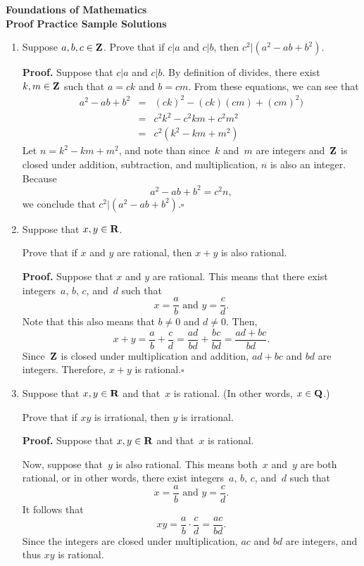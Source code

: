 \documentclass[12pt,letterpaper]{report}
\def\Z{{\bf Z}}
\def\Q{{\bf Q}}
\def\R{{\bf R}}
\begin{document}
\begin{center}
{\bf Foundations of Mathematics \\
Proof Practice Sample Solutions}\\
\end{center}


\begin{enumerate}

\item  Suppose $a,b,c\in\Z$.  Prove that if $c|a$ and $c|b$, then $c^2|(a^2 - ab + b^2)$.

\smallskip
\noindent\textbf{Proof.}
Suppose that $c|a$ and $c|b$.  By definition of divides, there exist $k,m\in\Z$ such that 
$a = ck$ and $b = cm$.  From these equations, we can see that
\begin{eqnarray*}
a^2 - ab + b^2 &=& (ck)^2 - (ck)(cm) + (cm)^2) \\
&=& c^2k^2 - c^2km + c^2m^2\\ 
&=& c^2(k^2 - km + m^2)\end{eqnarray*}
Let $n = k^2 - km + m^2$, and note than since~$k$ and~$m$ are integers and~$\Z$ is closed 
under addition, subtraction, and multiplication, $n$ is also an integer.  Because
$$a^2 - ab + b^2 = c^2 n,$$
we conclude that $c^2|(a^2 - ab + b^2)$.\hfill $\square$

\item  Suppose that $x,y\in\R$.  

Prove that if $x$ and $y$ are rational, then $x + y$ is also rational.

\smallskip
\noindent\textbf{Proof.}
Suppose that $x$ and $y$ are rational.  This means that there exist integers~$a$, $b$, $c$, and~$d$
such that $$x = \frac{a}{b} \mbox{ and }y = \frac{c}{d}.$$  Note that this also means that $b\neq 0$ and $d\neq 0$.
Then,
$$x + y =  \frac{a}{b} +  \frac{c}{d} = \frac{ad}{bd} +  \frac{bc}{bd} = \frac{ad + bc}{bd}.$$
Since~$\Z$ is closed under multiplication and addition, $ad + bc$ and $bd$ are integers.
Therefore, $x + y$ is rational.\hfill $\square$

\newpage

\item  Suppose that $x,y\in\R$ and that~$x$ is rational.  (In other words, $x\in\Q$.)

Prove that if $xy$ is irrational, then $y$ is irrational.

\smallskip
\noindent\textbf{Proof.}
Suppose that $x,y\in\R$ and that~$x$ is rational.

Now, suppose that~$y$ is also rational.  This means both~$x$ and~$y$ are both rational, or in other words,
there exist integers~$a$, $b$, $c$, and~$d$
such that $$x = \frac{a}{b} \mbox{ and }y = \frac{c}{d}.$$ 
It follows that $$xy = \frac{a}{b} \cdot \frac{c}{d} = \frac{ac}{bd}.$$
Since the integers are closed under multiplication, $ac$ and $bd$ are integers, and thus $xy$ is rational.


\end{enumerate}
\end{document}
